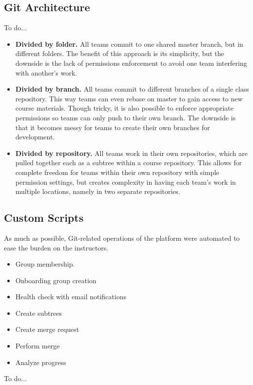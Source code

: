 \documentclass[12pt,twoside,vi]{mitthesis}
\newcommand{\wip}[1]{{\color{red} To do...}}
\begin{document}
\subsection{Git Architecture}

\wip{add more here}

\begin{itemize}
\item \textbf{Divided by folder.} All teams commit to one shared master branch, but in different folders. The benefit of this approach is its simplicity, but the downside is the lack of permissions enforcement to avoid one team interfering with another's work.
\item \textbf{Divided by branch.} All teams commit to different branches of a single class repository. This way teams can even rebase on master to gain access to new course materials. Though tricky, it is also possible to enforce appropriate permissions so teams can only push to their own branch. The downside is that it becomes messy for teams to create their own branches for development.
\item \textbf{Divided by repository.} All teams work in their own repositories, which are pulled together each as a subtree within a course repository. This allows for complete freedom for teams within their own repository with simple permission settings, but creates complexity in having each team's work in multiple locations, namely in two separate repositories. 
\end{itemize}

\subsection{Custom Scripts}

As much as possible, Git-related operations of the platform were automated to ease the burden on the instructors.
\begin{itemize}
\item Group membership.
\item Onboarding group creation
\item Health check with email notifications
\item Create subtrees
\item Create merge request
\item Perform merge
\item Analyze progress
\end{itemize}

\wip{add more here}
\end{document}
